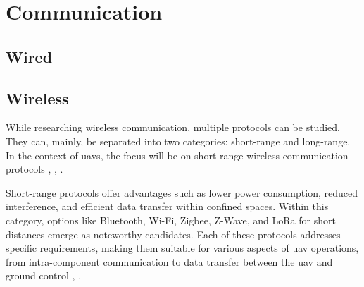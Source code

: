 \section{Communication}
\subsection{Wired}
\subsection{Wireless}
While researching wireless communication, multiple protocols can be studied. They can, mainly, be separated into two categories: short-range and long-range.
In the context of \glspl{uav}, the focus will be on short-range wireless communication protocols \cite{WCOM1}, \cite{WCOM6}, \cite{WCOM7}.

Short-range protocols offer advantages such as lower power consumption, reduced interference, and efficient data transfer within confined spaces.
Within this category, options like Bluetooth, Wi-Fi, Zigbee, Z-Wave, and LoRa for short distances emerge as noteworthy candidates.
Each of these protocols addresses specific requirements, making them suitable for various aspects of \gls{uav} operations, from intra-component communication to data transfer between the \gls{uav} and ground control \cite{WCOM6}, \cite{WCOM7}.

